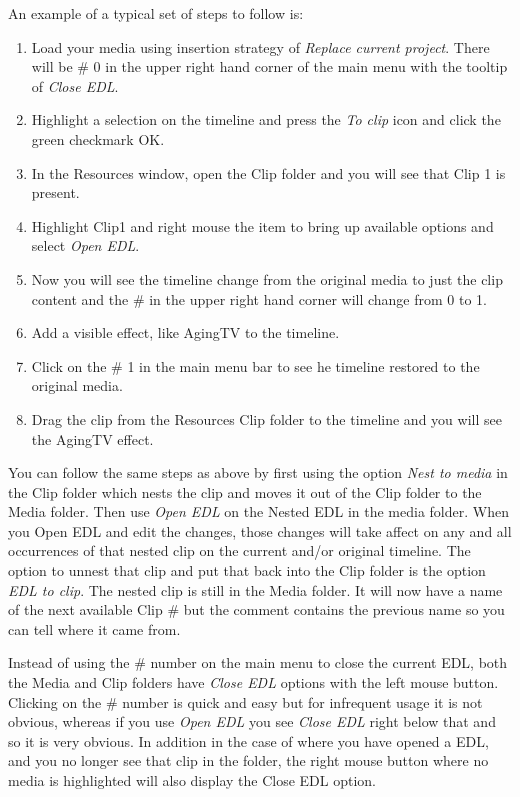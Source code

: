 An example of a typical set of steps to follow is:
\begin{enumerate}
\item Load your media using insertion strategy of \textit{Replace
    current project}.  There will be \# 0 in the upper right hand corner
  of the main menu with the tooltip of \textit{Close EDL}.
\item Highlight a selection on the timeline and press the
  \textit{To clip} icon and click the green checkmark OK.
\item In the Resources window, open the Clip folder and you will
  see that Clip 1 is present.
\item Highlight Clip1 and right mouse the item to bring up
  available options and select \textit{Open EDL}.
\item Now you will see the timeline change from the original
  media to just the clip content and the \# in the upper right hand
  corner will change from 0 to 1.
\item Add a visible effect, like AgingTV to the timeline.
\item Click on the \# 1 in the main menu bar to see he timeline
  restored to the original media.
\item Drag the clip from the Resources Clip folder to the
  timeline and you will see the AgingTV effect.
\end{enumerate}

You can follow the same steps as above by first using the option
\textit{Nest to media} in the Clip folder which nests the clip and
moves it out of the Clip folder to the Media folder.  Then use
\textit{Open EDL} on the Nested EDL in the media folder.  When you
Open EDL and edit the changes, those changes will take affect on any
and all occurrences of that nested clip on the current and/or
original timeline. The option to unnest that clip and put that back
into the Clip folder is the option \textit{EDL to clip}.  The nested
clip is still in the Media folder.  It will now have a name of the
next available Clip \# but the comment contains the previous name so
you can tell where it came from.

Instead of using the \# number on the main menu to close the current
EDL, both the Media and Clip folders have \textit{Close EDL} options
with the left mouse button. Clicking on the \# number is quick and
easy but for infrequent usage it is not obvious, whereas if you use
\textit{Open EDL} you see \textit{Close EDL} right below that and so
it is very obvious.  In addition in the case of where you have
opened a EDL, and you no longer see that clip in the folder, the
right mouse button where no media is highlighted will also display
the Close EDL option.

